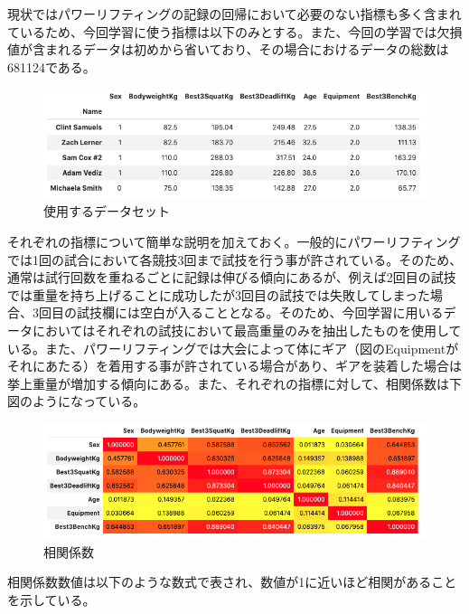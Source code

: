 \documentclass{article}
\begin{document}
現状ではパワーリフティングの記録の回帰において必要のない指標も多く含まれているため、今回学習に使う指標は以下のみとする。また、今回の学習では欠損値が含まれるデータは初めから省いており、その場合におけるデータの総数は681124である。

\begin{figure}[H]
\begin{center}
\includegraphics[width=\linewidth]{data_trimed.png}
\caption{使用するデータセット}
\end{center}
\end{figure}

それぞれの指標について簡単な説明を加えておく。一般的にパワーリフティングでは1回の試合において各競技3回まで試技を行う事が許されている。そのため、通常は試行回数を重ねるごとに記録は伸びる傾向にあるが、例えば2回目の試技では重量を持ち上げることに成功したが3回目の試技では失敗してしまった場合、3回目の試技欄には空白が入ることとなる。そのため、今回学習に用いるデータにおいてはそれぞれの試技において最高重量のみを抽出したものを使用している。また、パワーリフティングでは大会によって体にギア（図のEquipmentがそれにあたる）を着用する事が許されている場合があり、ギアを装着した場合は挙上重量が増加する傾向にある。また、それぞれの指標に対して、相関係数は下図のようになっている。

\begin{figure}[H]
\begin{center}
\includegraphics[width=\linewidth]{corr.png}
\caption{相関係数}
\end{center}
\end{figure}

相関係数数値は以下のような数式で表され、数値が1に近いほど相関があることを示している。
\end{document}
